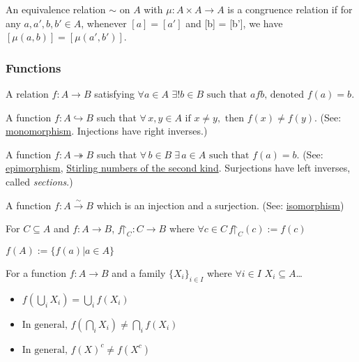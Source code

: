 \begin{proposition}
An equivalence relation $\sim$ on $A$ with $\mu : A \times A \rightarrow A$ is a congruence relation if for any $a,a',b,b' \in A$, whenever $[a] = [a']$ and
[b] = [b'], we have $[\mu(a,b)]=[\mu(a',b')]$.
\end{proposition}

\subsubsection{Functions}\label{function}
A relation $f: A \rightarrow B$ satisfying $\forall a \in A$ \mbox{$\exists! b \in B \textrm{ such that } afb \textrm{, denoted } f(a) = b$.}

\label{injection}
A function $\ensuremath{f: A \hookrightarrow B}$ such that $\forall \, x,y \in A \textrm{ if } x \neq y, \textrm{ then } f(x) \neq f(y)$. (See: \hyperref[monomorphism]{monomorphism}. Injections have right inverses.)

\label{surjection}
A function $\ensuremath{f: A \twoheadrightarrow B}$ such that $\forall \, b \in B \; \exists \, a \in A \textrm{ such that } f(a) = b$. (See: \hyperref[epimorphism]{epimorphism}, \hyperref[secondstirlingnumbers]{Stirling numbers of the second kind}.
Surjections have left inverses, called \emph{sections}.)

\label{bijection}
A function $f: A \xrightarrow{\sim} B$ which is an injection and a surjection. (See: \hyperref[isomorphism]{isomorphism})

\label{restriction}
For $C \subseteq A$ and $f:A \rightarrow B$, $\ensuremath{f\mathord{\upharpoonright}_C:C \rightarrow B}$ where \mbox{$\forall c \in C \, \ensuremath{f\mathord{\upharpoonright}_C(c)} := f(c)$}

\label{image}
$f(A) := \{f(a) | a \in A \}$

\begin{proposition}
For a function $f : A \rightarrow B$ and a family $\{X_i\}_{i \in I}$ where $\forall i \in I$ $X_i \subseteq A$\dots
\begin{itemize}
  \item $f(\bigcup_i X_i) = \bigcup_i f(X_i)$
  \item $\textrm{In general, } f(\bigcap_i X_i) \neq \bigcap_i f(X_i)$
  \item $\textrm{In general, } f(X)^c \neq f(X^c)$
\end{itemize}
\end{proposition}

